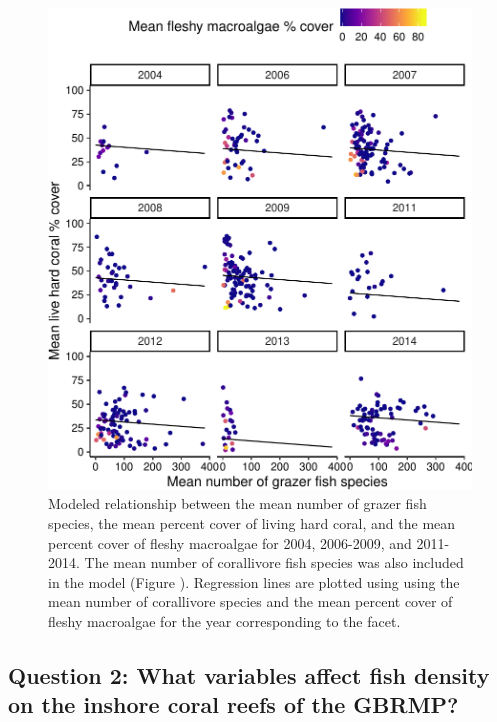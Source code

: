\documentclass[12pt,]{article}
\begin{document}
\begin{figure}

{\centering \includegraphics{Mullaney_ENV872_Project_files/figure-latex/Coral Percent Cover Plot (Grazers)-1} 

}

\caption{Modeled relationship between the mean number of grazer fish species, the mean percent cover of living hard coral, and the mean percent cover of fleshy macroalgae for 2004, 2006-2009, and 2011-2014. The mean number of corallivore fish species was also included in the model (Figure ). Regression lines are plotted using using the mean number of corallivore species and the mean percent cover of fleshy macroalgae for the year corresponding to the facet.}\label{fig:Coral Percent Cover Plot (Grazers)}
\end{figure}

\hypertarget{question-2-what-variables-affect-fish-density-on-the-inshore-coral-reefs-of-the-gbrmp}{%
\subsection{Question 2: What variables affect fish density on the
inshore coral reefs of the
GBRMP?}\label{question-2-what-variables-affect-fish-density-on-the-inshore-coral-reefs-of-the-gbrmp}}
\end{document}
